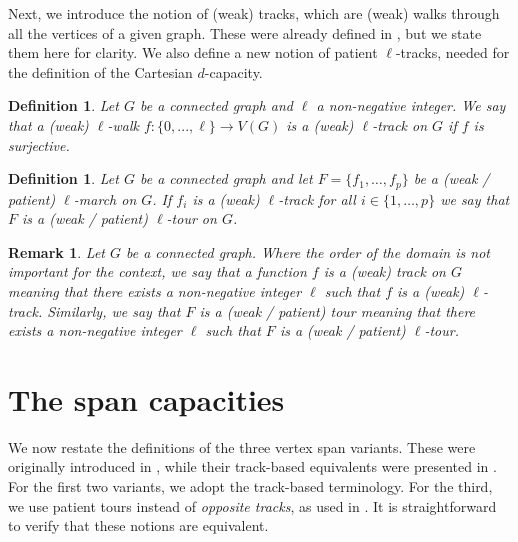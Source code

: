 \documentclass{article}
\newtheorem{definition}[theorem]{Definition}
\newtheorem{remark}[theorem]{Remark}
\begin{document}
Next, we introduce the notion of (weak) tracks, which are (weak) walks through all the vertices of a given graph. These were already defined in \cite{Erceg23}, but we state them here for clarity. We also define a new notion of patient $\ell$-tracks, needed for the definition of the Cartesian $d$-capacity.


\begin{definition} Let $G$ be a connected graph and $\ell$ a non-negative integer. We say that a (weak) $\ell$-walk $f : \{0,...,\ell\} \rightarrow V(G)$ is a \emph{(weak) $\ell$-track on $G$} if $f$ is surjective.
\end{definition}


\begin{definition}
    Let $G$ be a connected graph and let $F=\{f_1,\ldots,f_p\}$ be a (weak / patient) $\ell$-march on $G$. If $f_i$ is a (weak) $\ell$-track for all $i\in \{1,\ldots,p\}$ we say that $F$ is a \emph{(weak / patient) $\ell$-tour on $G$}.
\end{definition}
   
\begin{remark}
Let $G$ be a connected graph. Where the order of the domain is not important for the context, we say that a function $f$ is a (weak) track on $G$ meaning that there exists a non-negative integer $\ell$ such that $f$ is a (weak) $\ell$-track. Similarly, we say that $F$ is a (weak / patient) tour meaning that there exists a non-negative integer $\ell$ such that $F$ is a (weak / patient) $\ell$-tour.
\end{remark}


\section{The span capacities}\label{sec:results}

We now restate the definitions of the three vertex span variants. These were originally introduced in \cite{BaTa23}, while their track-based equivalents were presented in \cite{Erceg23}. For the first two variants, we adopt the track-based terminology. For the third, we use patient tours instead of \emph{opposite tracks}, as used in \cite{Erceg23}. It is straightforward to verify that these notions are equivalent.
\end{document}
